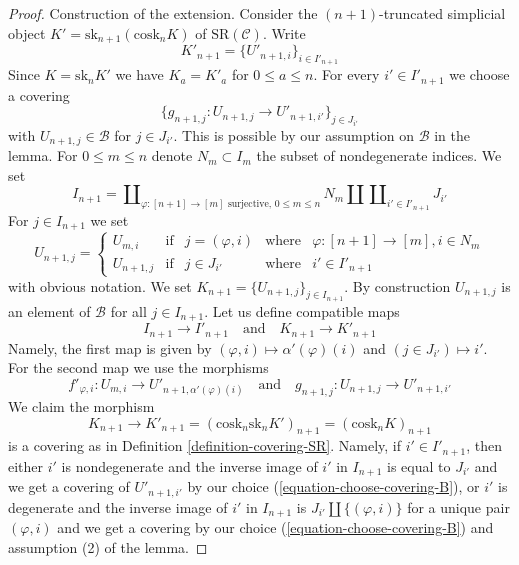 \begin{proof}
\medskip\noindent
Construction of the extension. Consider the $(n + 1)$-truncated simplicial
object $K' = \text{sk}_{n + 1}(\text{cosk}_n K)$ of $\text{SR}(\mathcal{C})$.
Write
$$
K'_{n + 1} = \{U'_{n + 1, i}\}_{i \in I'_{n + 1}}
$$
Since $K = \text{sk}_n K'$ we have $K_a = K'_a$ for $0 \leq a \leq n$.
For every $i' \in I'_{n + 1}$ we choose a covering
\begin{equation}
\label{equation-choose-covering-B}
\{g_{n + 1, j} : U_{n + 1, j} \to U'_{n + 1, i'}\}_{j \in J_{i'}}
\end{equation}
with $U_{n + 1, j} \in \mathcal{B}$ for $j \in J_{i'}$.
This is possible by our assumption on $\mathcal{B}$ in the lemma.
For $0 \leq m \leq n$ denote $N_m \subset I_m$ the subset of
nondegenerate indices. We set
$$
I_{n + 1} =
\coprod\nolimits_{\varphi : [n + 1] \to [m]\text{ surjective, }0\leq m \leq n}
N_m \amalg
\coprod\nolimits_{i' \in I'_{n + 1}} J_{i'}
$$
For $j \in I_{n + 1}$ we set
$$
U_{n + 1, j} =
\left\{
\begin{matrix}
U_{m, i} & \text{if} &
j = (\varphi, i) & \text{where} & \varphi : [n + 1] \to [m], i \in N_m \\
U_{n + 1, j} & \text{if} &
j \in J_{i'} & \text{where} & i' \in I'_{n + 1}
\end{matrix}
\right.
$$
with obvious notation. We set $K_{n + 1} = \{U_{n + 1, j}\}_{j \in I_{n + 1}}$.
By construction $U_{n + 1, j}$ is an element
of $\mathcal{B}$ for all $j \in I_{n + 1}$. Let us define compatible
maps
$$
I_{n + 1} \to I'_{n + 1}
\quad\text{and}\quad
K_{n + 1} \to K'_{n + 1}
$$
Namely, the first map is given by
$(\varphi, i) \mapsto \alpha'(\varphi)(i)$ and
$(j \in J_{i'}) \mapsto i'$.
For the second map we use the morphisms
$$
f'_{\varphi, i} : U_{m, i} \to U'_{n + 1, \alpha'(\varphi)(i)}
\quad\text{and}\quad
g_{n + 1, j} : U_{n + 1, j} \to U'_{n + 1, i'}
$$
We claim the morphism
$$
K_{n + 1} \to K'_{n + 1} =
(\text{cosk}_n \text{sk}_n K')_{n + 1} =
(\text{cosk}_n K)_{n + 1}
$$
is a covering as in Definition \ref{definition-covering-SR}.
Namely, if $i' \in I'_{n + 1}$, then either $i'$ is nondegenerate
and the inverse image of $i'$ in $I_{n + 1}$ is equal to $J_{i'}$
and we get a covering of $U'_{n + 1, i'}$ by our choice
(\ref{equation-choose-covering-B}), or $i'$ is degenerate and
the inverse image of $i'$ in $I_{n + 1}$ is
$J_{i'} \amalg \{(\varphi, i)\}$ for a unique pair $(\varphi, i)$
and we get a covering by our choice (\ref{equation-choose-covering-B})
and assumption (2) of the lemma.


\end{proof}
